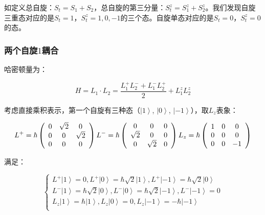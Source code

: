如定义总自旋：$S_t=S_1 +S_2$，总自旋的第三分量：$S_t^z = S_1^z +
S_2^z$。我们发现自旋三重态对应的是$S_t =1$，$S_t^z = 1, 0,
-1$的三个态。自旋单态对应的是$S_t = 0$，$S_t^z = 0$的态。


\subsubsection{两个自旋$1$耦合}

哈密顿量为：

\begin{equation}\label{two-spin-one-coupling}
   H = L_1 \cdot L_2 = \frac{L_1^+ L_2^- + L_1^- L_2^+}{2} + L_1^z
L_2^z
\end{equation}

考虑直接乘积表示，第一个自旋有三种态（$\left| 1 \right\rangle $,
$\left| 0 \right\rangle $, $\left| -1 \right\rangle
$），取$L_z$表象：




\begin{equation}\label{spin-one-raising-lowering-operators}
  L^ +   = \hbar \left( {\begin{array}{*{20}c}
   0 & {\sqrt 2 } & 0  \\
   0 & 0 & {\sqrt 2 }  \\
   0 & 0 & 0  \\
\end{array}} \right) L^ -   = \hbar \left( {\begin{array}{*{20}c}
   0 & 0 & 0  \\
   {\sqrt 2 } & 0 & 0  \\
   0 & {\sqrt 2 } & 0  \\
\end{array}} \right) L_z  = \hbar \left( {\begin{array}{*{20}c}
   1 & 0 & 0  \\
   0 & 0 & 0  \\
   0 & 0 & { - 1}  \\
\end{array}} \right)
\end{equation}


满足：

\begin{equation*}
    \left\{ \begin{array}{l}
 L^ +  \left| 1 \right\rangle  = 0,L^ +  \left| 0 \right\rangle  = \hbar \sqrt 2 \left| 1 \right\rangle ,L^ +  \left| { - 1} \right\rangle  = \hbar \sqrt 2 \left| 0 \right\rangle  \\
 L^ -  \left| 1 \right\rangle  = \hbar \sqrt 2 \left| 0 \right\rangle ,L^ -  \left| 0 \right\rangle  = \hbar \sqrt 2 \left| { - 1} \right\rangle ,L^ -  \left| { - 1} \right\rangle  = 0 \\
 L_z \left| 1 \right\rangle  = \hbar \left| 1 \right\rangle ,L_z \left| 0 \right\rangle  = 0,L_z \left| { - 1} \right\rangle  =  - \hbar \left| { - 1} \right\rangle  \\
 \end{array} \right.
\end{equation*}


